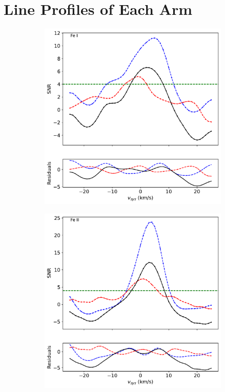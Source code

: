 \documentclass[twocolumn]{aastex631}
\begin{document}
        \section{Line Profiles of Each Arm}
            \begin{figure}[ht!]\label{fig:line-profle-overlaid-arms}
                \begin{subfigure}[b]{0.3\textwidth}
                    \centering
                    \includegraphics[width=\textwidth]{plots-updated/line-profile-overlaidarms/KELT-20b.20190504.combined.Fe I.line-profiles-overlaidarms.pdf}
                \end{subfigure}
                \begin{subfigure}[b]{0.3\textwidth}
                    \centering
                    \includegraphics[width=\textwidth]{plots-updated/line-profile-overlaidarms/KELT-20b.20190504.combined.Fe II.line-profiles-overlaidarms.pdf}

\end{subfigure}
\end{figure}
\end{document}
